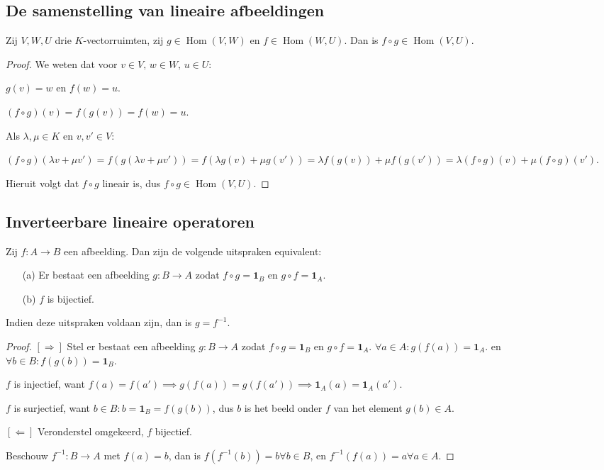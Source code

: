 \subsection{De samenstelling van lineaire afbeeldingen}

\begin{lemma}[3.5.2]
    Zij $V, W, U$ drie $K$-vectorruimten, zij $g \in \operatorname{Hom}(V, W)$ en $f \in \operatorname{Hom}(W, U)$. Dan is $f \circ g \in \operatorname{Hom}(V, U)$.
\end{lemma}
\begin{proof}
    We weten dat voor \(v \in V, \, w \in W ,\, u \in U\):

    \(g(v) = w \text{ en }f(w) = u\).

    \((f \circ g)(v) = f(g(v)) = f(w) = u\).

    Als \(\lambda,\mu \in K\) en \(v,v' \in V\):

    \( 
        (f \circ g)(\lambda v + \mu v') 
        = f(g(\lambda v + \mu v'))  
        = f(\lambda g(v) + \mu g(v'))
        = \lambda f(g(v)) + \mu f(g(v'))  
        = \lambda (f \circ g)(v) + \mu (f \circ g)(v') 
    \).

    Hieruit volgt dat \(f \circ g\) lineair is, dus \(f \circ g \in \operatorname{Hom}(V, U)\).
\end{proof}
\subsection{Inverteerbare lineaire operatoren}

\begin{lemma}[3.6.2]
    Zij $f \colon A \to B$ een afbeelding. Dan zijn de volgende uitspraken equivalent:
    \begin{enumerate}
        \item[(a)] Er bestaat een afbeelding $g \colon B \to A$ zodat $f \circ g = \mathbf{1}_B$ en $g \circ f = \mathbf{1}_A$.
        \item[(b)] $f$ is bijectief.
    \end{enumerate}
    Indien deze uitspraken voldaan zijn, dan is $g = f^{-1}$.
\end{lemma}
\begin{proof}
      \([\Rightarrow]\)  Stel er bestaat een afbeelding $g \colon B \to A$ zodat $f \circ g = \mathbf{1}_B$ en $g \circ f = \mathbf{1}_A$.
        \(\forall a \in A: g(f(a)) = \mathbf{1}_A.\) en \(\forall b \in B: f(g(b)) = \mathbf{1}_B.\)

        \(f\) is injectief, want \(f(a)=f(a') \implies g(f(a))=g(f(a')) \implies \mathbf{1}_A(a) = \mathbf{1}_A(a').  \)

        \(f\) is surjectief, want \(b \in B: b = \mathbf{1}_B = f(g(b))\),
        dus \(b\) is het beeld onder \(f\) van het element \(g(b) \in A\).

    \([\Leftarrow]\) Veronderstel omgekeerd, \(f\) bijectief.

    Beschouw \(f^{-1}: B \to A\) met \(f(a) = b\), dan is \(f(f^{-1}(b))=b\forall b \in B\),
    en \(f^{-1}(f(a))=a\forall a \in A\).
\end{proof}